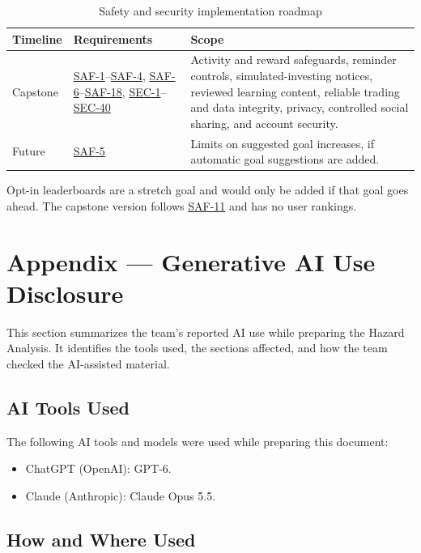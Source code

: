 \documentclass{article}
\newcommand{\reqref}[1]{\hyperref[req:#1]{#1}}
\begin{document}
\begin{table}[H]
\centering
\caption{Safety and security implementation roadmap}
\label{TblSafetyRoadmap}
\begin{tabularx}{\textwidth}{>{\raggedright\arraybackslash}p{1.7cm}>{\raggedright\arraybackslash}p{2.65cm}X}
\toprule
\textbf{Timeline} & \textbf{Requirements} & \textbf{Scope}\\
\midrule
Capstone &
\reqref{SAF-1}--\reqref{SAF-4},
\reqref{SAF-6}--\reqref{SAF-18},
\reqref{SEC-1}--\reqref{SEC-40} &
Activity and reward safeguards, reminder controls, simulated-investing
notices, reviewed learning content, reliable trading and data integrity,
privacy, controlled social sharing, and account security.\\
\addlinespace
Future & \reqref{SAF-5} &
Limits on suggested goal increases, if automatic goal suggestions are added.\\
\bottomrule
\end{tabularx}
\end{table}

Opt-in leaderboards are a stretch goal and would only be added if that goal
goes ahead. The capstone version follows \reqref{SAF-11} and has no user
rankings.

\newpage{}

\section{Appendix --- Generative AI Use Disclosure}

This section summarizes the team's reported AI use while preparing the Hazard Analysis. It identifies the tools used, the sections affected, and how the team checked the AI-assisted material.

\subsection{AI Tools Used}

The following AI tools and models were used while preparing this document:
\begin{itemize}
    \item ChatGPT (OpenAI): GPT-6.
    \item Claude (Anthropic): Claude Opus 5.5. 
\end{itemize}

\subsection{How and Where Used}
\end{document}
